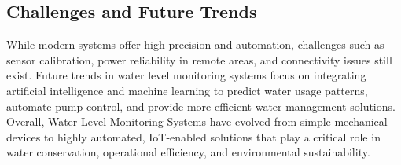 {    \subsection{Challenges and Future Trends}
    While modern systems offer high precision and automation, challenges such as sensor calibration,
    power reliability in remote areas, and connectivity issues still exist. Future trends in water level
    monitoring systems focus on integrating artificial intelligence and machine learning to predict water
    usage patterns, automate pump control, and provide more efficient water management solutions.\\
    
    \noindent
    Overall, Water Level Monitoring Systems have evolved from simple mechanical devices to highly
    automated, IoT-enabled solutions that play a critical role in water conservation, operational efficiency,
    and environmental sustainability.
    }


